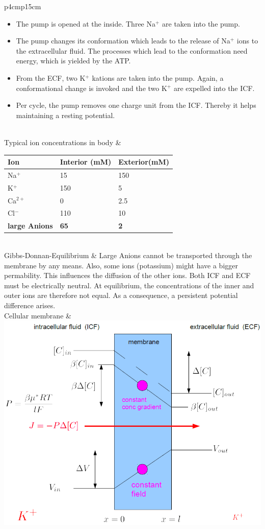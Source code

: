 \begin{longtable}{p{4cm}p{15cm}}
\begin{itemize}
				\item The pump is opened at the inside. Three Na$^+$ are taken into the pump.
				\item The pump changes its conformation which leads to the release of Na$^+$ ions to the extracellular fluid. The processes which lead to the conformation need energy, which is yielded by the ATP.
				\item From the ECF, two K$^+$ kations are taken into the pump. Again, a conformational change is invoked and the two K$^+$ are expelled into the ICF.
				\item Per cycle, the pump removes one charge unit from the ICF. Thereby it helps maintaining a resting potential.
                       	  \end{itemize}\\
Typical ion concentrations in body		& \begin{tabular}{lll}
			    Ion		& Interior (mM)	& Exterior(mM)\\\hline
			    Na$^+$	& 15		& 150\\
			    K$^+$	& 150		& 5\\
			    Ca$^{2+}$	& 0		& 2.5\\
			    Cl$^-$	& 110		& 10\\
		\textbf{large Anions}	& \textbf{65}	& \textbf{2}
			  \end{tabular}\\
Gibbs-Donnan-Equilibrium	& Large Anions cannot be transported through the membrane by any means. Also, some ions (potassium) might have a bigger permability. This influences the diffusion of the other ions. Both ICF and ECF must be electrically neutral. At equilibrium, the concentrations of the inner and outer ions are therefore not equal. As a consequence, a persistent potential difference arises.\\
Cellular membrane	& \includegraphics[width = 14cm]{neuroinf_cell_membrane_transport.png}\\
\end{longtable}
